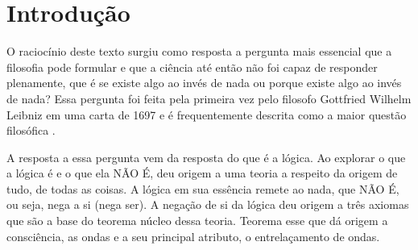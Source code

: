 \section*{Introdução}

O raciocínio deste texto surgiu como resposta a pergunta mais essencial que a filosofia pode formular e que a ciência até então não foi capaz de responder plenamente, que é se existe algo ao invés de nada ou porque existe algo ao invés de nada? 
Essa pergunta foi feita pela primeira vez pelo filosofo Gottfried Wilhelm Leibniz em uma carta de 1697 e é frequentemente descrita como a maior questão filosófica \cite{ leibnizbrasil_origem_das_coisas}.

A resposta a essa pergunta vem da resposta do que é a lógica. Ao explorar o que a lógica é e o que ela NÃO É, deu origem a uma teoria a respeito da origem de tudo, de todas as coisas. A lógica em sua essência remete ao nada, que NÃO É, ou seja, nega a si (nega ser). A negação de si da lógica deu origem a três axiomas que são a base do teorema núcleo dessa teoria. Teorema esse que dá origem a consciência, as ondas e a seu principal atributo, o entrelaçamento de ondas. 


